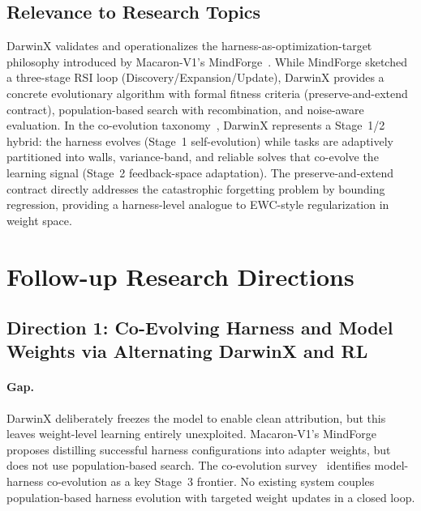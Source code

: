 \documentclass[11pt,a4paper]{article}
\begin{document}
\subsection{Relevance to Research Topics}

DarwinX validates and operationalizes the harness-as-optimization-target philosophy introduced by Macaron-V1's MindForge~\cite{macaron2026}. While MindForge sketched a three-stage RSI loop (Discovery/Expansion/Update), DarwinX provides a concrete evolutionary algorithm with formal fitness criteria (preserve-and-extend contract), population-based search with recombination, and noise-aware evaluation. In the co-evolution taxonomy~\cite{coevo2026}, DarwinX represents a Stage~1/2 hybrid: the harness evolves (Stage~1 self-evolution) while tasks are adaptively partitioned into walls, variance-band, and reliable solves that co-evolve the learning signal (Stage~2 feedback-space adaptation). The preserve-and-extend contract directly addresses the catastrophic forgetting problem by bounding regression, providing a harness-level analogue to EWC-style regularization in weight space.

\section{Follow-up Research Directions}

\subsection{Direction 1: Co-Evolving Harness and Model Weights via Alternating DarwinX and RL}

\paragraph{Gap.} DarwinX deliberately freezes the model to enable clean attribution, but this leaves weight-level learning entirely unexploited. Macaron-V1's MindForge proposes distilling successful harness configurations into adapter weights, but does not use population-based search. The co-evolution survey~\cite{coevo2026} identifies model-harness co-evolution as a key Stage~3 frontier. No existing system couples population-based harness evolution with targeted weight updates in a closed loop.
\end{document}
